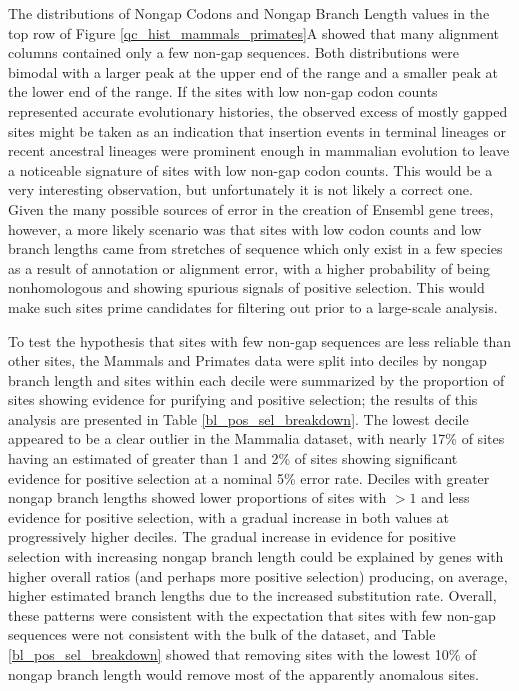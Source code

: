 The distributions of Nongap Codons and Nongap Branch Length values in
the top row of Figure \ref{qc_hist_mammals_primates}A showed that many
alignment columns contained only a few non-gap sequences. Both
distributions were bimodal with a larger peak at the upper end of the
range and a smaller peak at the lower end of the range. If the sites
with low non-gap codon counts represented accurate evolutionary
histories, the observed excess of mostly gapped sites might be taken
as an indication that insertion events in terminal lineages or recent
ancestral lineages were prominent enough in mammalian evolution to
leave a noticeable signature of sites with low non-gap codon
counts. This would be a very interesting observation, but
unfortunately it is not likely a correct one. Given the many possible
sources of error in the creation of Ensembl gene trees, however, a
more likely scenario was that sites with low codon counts and low
branch lengths came from stretches of sequence which only exist in a
few species as a result of annotation or alignment error, with a
higher probability of being nonhomologous and showing spurious signals
of positive selection. This would make such sites prime candidates for
filtering out prior to a large-scale analysis.

To test the hypothesis that sites with few non-gap sequences are less
reliable than other sites, the Mammals and Primates data were split
into deciles by nongap branch length and sites within each decile were
summarized by the proportion of sites showing evidence for purifying
and positive selection; the results of this analysis are presented in
Table \ref{bl_pos_sel_breakdown}. The lowest decile appeared to be a
clear outlier in the Mammalia dataset, with nearly 17\% of sites
having an estimated \omg of greater than 1 and 2\% of sites showing
significant evidence for positive selection at a nominal 5\% error
rate. Deciles with greater nongap branch lengths showed lower
proportions of sites with \omg $> 1$ and less evidence for positive
selection, with a gradual increase in both values at progressively
higher deciles. The gradual increase in evidence for positive
selection with increasing nongap branch length could be explained by
genes with higher overall \dnds ratios (and perhaps more positive
selection) producing, on average, higher estimated branch lengths due
to the increased \nsyn substitution rate. Overall, these patterns were
consistent with the expectation that sites with few non-gap sequences
were not consistent with the bulk of the dataset, and Table
\ref{bl_pos_sel_breakdown} showed that removing sites with the lowest
10\% of nongap branch length would remove most of the apparently
anomalous sites.

